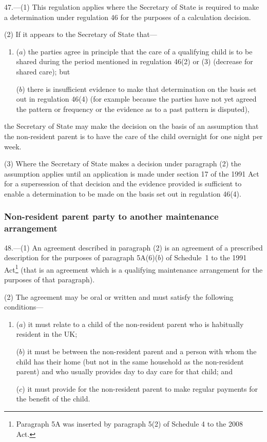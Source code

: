 \documentclass[12pt,a4paper]{article}
\begin{document}
47.---(1)  This regulation applies where the Secretary of State is required to make a determination under regulation 46 for the purposes of a calculation decision.

(2) If it appears to the Secretary of State that—
\begin{enumerate}\item[]
($a$) the parties agree in principle that the care of a qualifying child is to be shared during the period mentioned in regulation 46(2) or (3) (decrease for shared care); but

($b$) there is insufficient evidence to make that determination on the basis set out in regulation 46(4) (for example because the parties have not yet agreed the pattern or frequency or the evidence as to a past pattern is disputed),
\end{enumerate}
the Secretary of State may make the decision on the basis of an assumption that the non-resident parent is to have the care of the child overnight for one night per week.

(3) Where the Secretary of State makes a decision under paragraph (2) the assumption applies until an application is made under section 17 of the 1991 Act for a supersession of that decision and the evidence provided is sufficient to enable a determination to be made on the basis set out in regulation 46(4).

\subsubsection[48. Non-resident parent party to another maintenance arrangement]{Non-resident parent party to another maintenance arrangement}

48.---(1)  An agreement described in paragraph (2) is an agreement of a prescribed description for the purposes of paragraph 5A(6)($b$)  of Schedule~1 to the 1991 Act\footnote{Paragraph 5A was inserted by paragraph 5(2) of Schedule 4 to the 2008 Act.} (that is an agreement which is a qualifying maintenance arrangement for the purposes of that paragraph).

(2) The agreement may be oral or written and must satisfy the following conditions—
\begin{enumerate}\item[]
($a$) it must relate to a child of the non-resident parent who is habitually resident in the UK;

($b$) it must be between the non-resident parent and a person with whom the child has their home (but not in the same household as the non-resident parent) and who usually provides day to day care for that child; and

($c$) it must provide for the non-resident parent to make regular payments for the benefit of the child.
\end{enumerate}
\end{document}
